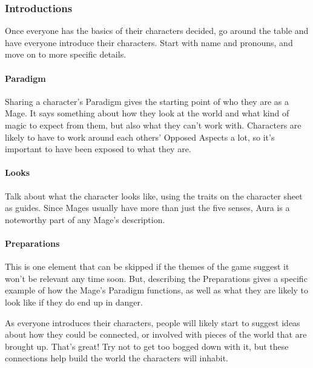 \documentclass[
]{article}
\begin{document}
\hypertarget{introductions}{%
\subsubsection{Introductions}\label{introductions}}

Once everyone has the basics of their characters decided, go around the
table and have everyone introduce their characters. Start with name and
pronouns, and move on to more specific details.

\hypertarget{paradigm-1}{%
\paragraph{Paradigm}\label{paradigm-1}}

Sharing a character's Paradigm gives the starting point of who they are
as a Mage. It says something about how they look at the world and what
kind of magic to expect from them, but also what they can't work with.
Characters are likely to have to work around each others' Opposed
Aspects a lot, so it's important to have been exposed to what they are.

\hypertarget{looks}{%
\paragraph{Looks}\label{looks}}

Talk about what the character looks like, using the traits on the
character sheet as guides. Since Mages usually have more than just the
five senses, Aura is a noteworthy part of any Mage's description.

\hypertarget{preparations}{%
\paragraph{Preparations}\label{preparations}}

This is one element that can be skipped if the themes of the game
suggest it won't be relevant any time soon. But, describing the
Preparations gives a specific example of how the Mage's Paradigm
functions, as well as what they are likely to look like if they do end
up in danger.

As everyone introduces their characters, people will likely start to
suggest ideas about how they could be connected, or involved with pieces
of the world that are brought up. That's great! Try not to get too
bogged down with it, but these connections help build the world the
characters will inhabit.
\end{document}
